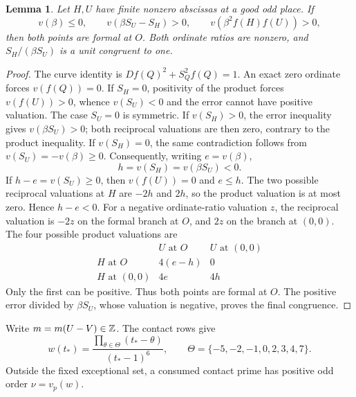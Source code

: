 \documentclass[11pt,a4paper]{article}
\newtheorem{lemma}[theorem]{Lemma}
\begin{document}
\begin{lemma}\label{lem:inverse}
Let $H,U$ have finite nonzero abscissas at a good odd place.
If
\[
 v(\beta)\le0,\qquad v(\beta S_U-S_H)>0,\qquad
                       v(\beta^2f(H)f(U))>0,
\]
then both points are formal at $O$. Both ordinate ratios are
nonzero, and $S_H/(\beta S_U)$ is a unit congruent to one.
\end{lemma}
\begin{proof}
The curve identity is $Df(Q)^2+S_Q^2f(Q)=1$.
An exact zero ordinate forces $v(f(Q))=0$. If $S_H=0$, positivity
of the product forces $v(f(U))>0$, whence $v(S_U)<0$ and the
error cannot have positive valuation. The case $S_U=0$ is symmetric.
If $v(S_H)>0$, the error inequality gives $v(\beta S_U)>0$;
both reciprocal valuations are then zero, contrary to the product
inequality. If $v(S_H)=0$, the same contradiction follows from
$v(S_U)=-v(\beta)\ge0$. Consequently, writing $e=v(\beta)$,
\[
                         h=v(S_H)=v(\beta S_U)<0.
\]
If $h-e=v(S_U)\ge0$, then $v(f(U))=0$ and $e\le h$.
The two possible reciprocal valuations at $H$ are $-2h$ and
$2h$, so the product valuation is at most zero. Hence $h-e<0$.
For a negative ordinate-ratio valuation $z$, the reciprocal
valuation is $-2z$ on the formal branch at $O$, and $2z$ on the
branch at $(0,0)$. The four possible product valuations are
\[
\begin{array}{c|cc}
 & U\text{ at }O & U\text{ at }(0,0)\\\hline
 H\text{ at }O &4(e-h)&0\\
 H\text{ at }(0,0)&4e&4h
\end{array}
\]
Only the first can be positive. Thus both points are formal at $O$.
The positive error divided by $\beta S_U$, whose valuation is
negative, proves the final congruence.
\end{proof}

Write $m=m(U-V)\in\mathbb Z$. The contact rows give
\[
 w(t_*)=\frac{\prod_{\theta\in\Theta}(t_*-\theta)}{(t_*-1)^6},
 \qquad \Theta=\{-5,-2,-1,0,2,3,4,7\}.
\]
Outside the fixed exceptional set, a consumed contact prime has
positive odd order $\nu=v_p(w)$.
\end{document}
